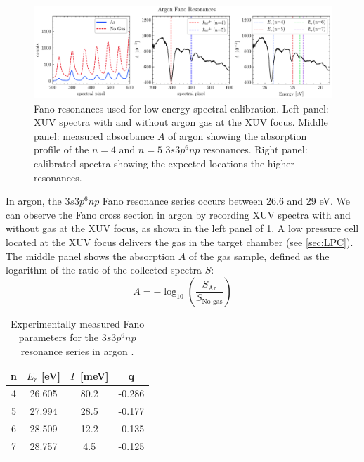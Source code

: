 \begin{figure}
	\centering
	\includegraphics[width=1.0\textwidth]{figures/chap2/ar-fano-calibration.pdf}
	\caption{Fano resonances used for low energy spectral calibration. Left panel: XUV spectra with and without argon gas at the XUV focus. Middle panel: measured absorbance $A$ of argon showing the absorption profile of the $n=4$ and $n=5$ $3s3p^6np$ resonances. Right panel: calibrated spectra showing the expected locations the higher resonances.}
	\label{fig:fano-calibration}
\end{figure}

In argon, the $3s3p^6np$ Fano resonance series occurs between 26.6 and 29 eV. We can observe the Fano cross section in argon by recording XUV spectra with and without gas at the XUV focus, as shown in the left panel of \cref{fig:fano-calibration}. A low pressure cell located at the XUV focus delivers the gas in the target chamber (see \cref{sec:LPC}). The middle panel shows the absorption $A$ of the gas sample, defined as the logarithm of the ratio of the collected spectra $S$:
\begin{equation}
A = - \log_{10} \left( \frac{S_{\textrm{Ar}}}{S_{\textrm{No gas}}} \right)
\end{equation}

\begin{table}[]
	\centering
	\begin{tabular}{c|c|c|c}
		n & $E_r$ {[}eV{]} & $\Gamma$ {[}meV{]} & q \\ \hline
		4 & 26.605 & 80.2 & -0.286 \\ \hline
		5 & 27.994 & 28.5 & -0.177 \\ \hline
		6 & 28.509 & 12.2 & -0.135 \\ \hline
		7 & 28.757 & 4.5 & -0.125
	\end{tabular}
	\caption{Experimentally measured Fano parameters for the $3s3p^6np$ resonance series in argon \cite{caretteMulticonfigurationalHartreeFockClosecoupling2013}.}
	\label{tab:fano-parameters}
\end{table}

